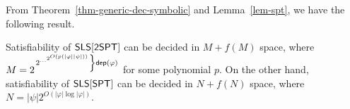 From Theorem~\ref{thm-generic-dec-symbolic} and Lemma~\ref{lem-spt}, we have the following result.
\begin{theorem}
Satisfiability of $\textsf{SLS}[\textsf{2SPT}]$ can be decided in $M + f(M)$ space, where $M = 2^{\left. 2^{\ldots ^{2^{O(p(|\varphi| |\psi|))}} }\right\}\mathsf{dep}(\varphi)}$ for some polynomial $p$. On the other hand,  satisfiability of $\textsf{SLS}[\textsf{SPT}]$ can be decided in $N+ f(N)$ space, where $N = |\psi| 2^{O(|\varphi|\log |\varphi|)}$.
\end{theorem}




